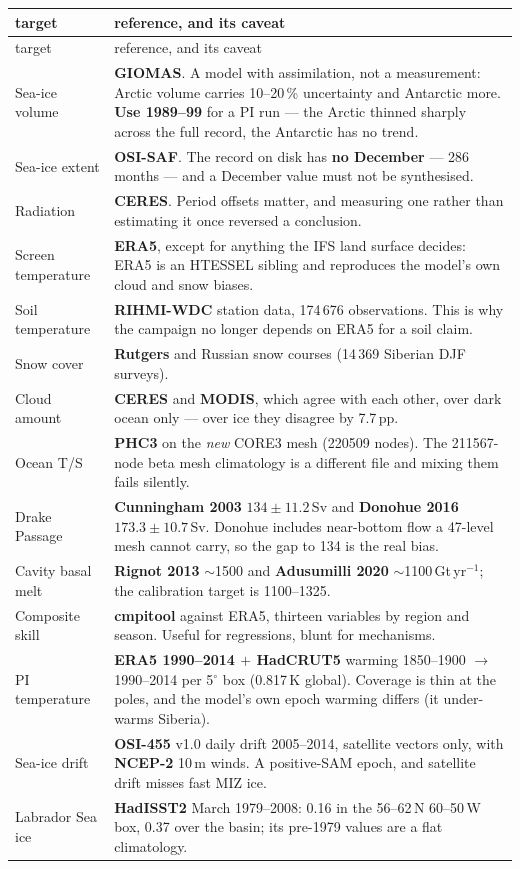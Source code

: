 \documentclass[10pt]{article}
\begin{document}
{\small
\begin{longtable}{p{3.2cm}p{12.6cm}}
\toprule
target & reference, and its caveat \\
\midrule
\endfirsthead
\toprule
target & reference, and its caveat \\
\midrule
\endhead
Sea-ice volume & \textbf{GIOMAS}. A model with assimilation, not a measurement: Arctic
volume carries 10--20\,\% uncertainty and Antarctic more. \textbf{Use 1989--99} for a PI
run --- the Arctic thinned sharply across the full record, the Antarctic has no trend. \\
Sea-ice extent & \textbf{OSI-SAF}. The record on disk has \textbf{no December} --- 286
months --- and a December value must not be synthesised. \\
Radiation & \textbf{CERES}. Period offsets matter, and measuring one rather than estimating
it once reversed a conclusion. \\
Screen temperature & \textbf{ERA5}, except for anything the IFS land surface decides: ERA5
is an HTESSEL sibling and reproduces the model's own cloud and snow biases. \\
Soil temperature & \textbf{RIHMI-WDC} station data, 174\,676 observations. This is why the
campaign no longer depends on ERA5 for a soil claim. \\
Snow cover & \textbf{Rutgers} and Russian snow courses (14\,369 Siberian DJF surveys). \\
Cloud amount & \textbf{CERES} and \textbf{MODIS}, which agree with each other, over dark
ocean only --- over ice they disagree by 7.7\,pp. \\
Ocean T/S & \textbf{PHC3} on the \emph{new} CORE3 mesh (220509 nodes). The 211567-node beta
mesh climatology is a different file and mixing them fails silently. \\
Drake Passage & \textbf{Cunningham 2003} $134\pm11.2$\,Sv and \textbf{Donohue 2016}
$173.3\pm10.7$\,Sv. Donohue includes near-bottom flow a 47-level mesh cannot carry, so the
gap to 134 is the real bias. \\
Cavity basal melt & \textbf{Rignot 2013} $\sim$1500 and \textbf{Adusumilli 2020}
$\sim$1100\,Gt\,yr$^{-1}$; the calibration target is 1100--1325. \\
Composite skill & \textbf{cmpitool} against ERA5, thirteen variables by region and season.
Useful for regressions, blunt for mechanisms. \\
PI temperature & \textbf{ERA5 1990--2014 $+$ HadCRUT5} warming 1850--1900 $\to$ 1990--2014 per
5$^\circ$ box (0.817\,K global). Coverage is thin at the poles, and the model's own epoch warming
differs (it under-warms Siberia). \\
Sea-ice drift & \textbf{OSI-455} v1.0 daily drift 2005--2014, satellite vectors only, with
\textbf{NCEP-2} 10\,m winds. A positive-SAM epoch, and satellite drift misses fast MIZ ice. \\
Labrador Sea ice & \textbf{HadISST2} March 1979--2008: 0.16 in the 56--62\,N 60--50\,W box, 0.37
over the basin; its pre-1979 values are a flat climatology. \\
\bottomrule
\end{longtable}}
\end{document}
